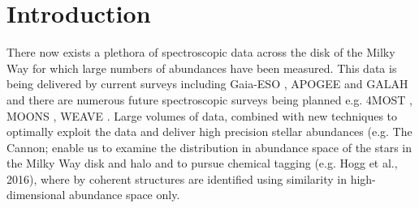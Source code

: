 \documentclass[14pt, preprint2]{aastex6}
\begin{document}
\section{Introduction}

There now exists a plethora of spectroscopic data across the disk of the Milky Way for which large numbers of abundances have been measured. This data is being delivered by current surveys including Gaia-ESO \citep{gilmore2012}, APOGEE \citep{Majewski2015} and GALAH \citep{Freeman2012, deSilva2015} and there are numerous future spectroscopic surveys being planned e.g. 4MOST \citep{deJong2015}, MOONS \citep{C2012}, WEAVE \citep{D2012}. Large volumes of data, combined with new techniques to optimally exploit the data and deliver high precision stellar abundances (e.g. The Cannon; \citep{Ness2015, Casey2016} enable us to examine the distribution in abundance space of the stars in the Milky Way disk and halo and to pursue chemical tagging (e.g. Hogg et al., 2016), where by coherent structures are identified using similarity in high-dimensional abundance space only.  

\end{document}
